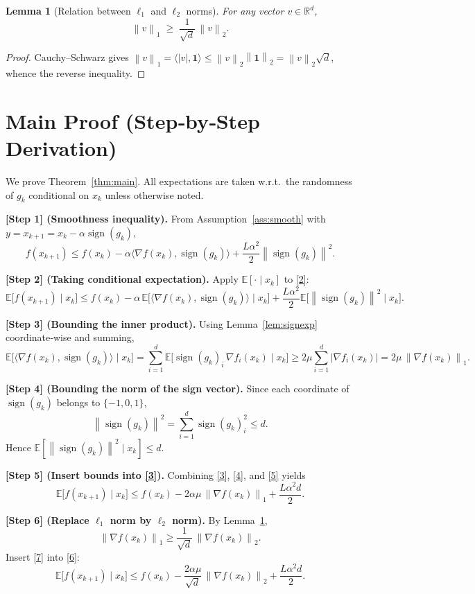 \documentclass{article}
\newtheorem{lemma}{Lemma}
\newcommand{\sign}{\operatorname{sign}}
\newcommand{\E}{\mathbb{E}}
\newcommand{\R}{\mathbb{R}}
\newcommand{\norm}[1]{\left\lVert#1\right\rVert}
\newcommand{\ip}[2]{\langle #1,#2\rangle}
\begin{document}
\begin{lemma}[Relation between $\ell_1$ and $\ell_2$ norms]\label{lem:l1l2}
For any vector $v\in\R^{d}$,
\[
\norm{v}_1 \;\ge\; \frac{1}{\sqrt d}\,\norm{v}_2 .
\tag{L1}
\]
\end{lemma}
\begin{proof}
Cauchy–Schwarz gives $\norm{v}_1 = \ip{|v|}{\mathbf{1}}\le
\norm{v}_2\norm{\mathbf{1}}_2 = \norm{v}_2\sqrt d$, whence the reverse inequality.
\end{proof}

\section*{Main Proof (Step‑by‑Step Derivation)}
We prove Theorem~\ref{thm:main}.  All expectations are taken w.r.t.\ the randomness of
$g_k$ conditional on $x_k$ unless otherwise noted.

\bigskip
\noindent\textbf{[Step 1] (Smoothness inequality).}
From Assumption~\ref{ass:smooth} with $y=x_{k+1}=x_k-\alpha\sign(g_k)$,
\[
f(x_{k+1})\le f(x_k)-\alpha\ip{\nabla f(x_k)}{\sign(g_k)}+\frac{L\alpha^2}{2}\norm{\sign(g_k)}^2 .
\tag{2}
\]

\noindent\textbf{[Step 2] (Taking conditional expectation).}
Apply $\E[\cdot\mid x_k]$ to \eqref{2}:
\[
\E\!\bigl[f(x_{k+1})\mid x_k\bigr]
\le f(x_k)-\alpha\,\E\!\bigl[\ip{\nabla f(x_k)}{\sign(g_k)}\mid x_k\bigr]
+\frac{L\alpha^2}{2}\E\!\bigl[\norm{\sign(g_k)}^2\mid x_k\bigr].
\tag{3}
\]

\noindent\textbf{[Step 3] (Bounding the inner product).}
Using Lemma~\ref{lem:signexp} coordinate‑wise and summing,
\[
\E\!\bigl[\ip{\nabla f(x_k)}{\sign(g_k)}\mid x_k\bigr]
=\sum_{i=1}^d \E\!\bigl[\sign(g_k)_i\,\nabla f_i(x_k)\mid x_k\bigr]
\ge 2\mu\sum_{i=1}^d |\nabla f_i(x_k)|
=2\mu\,\norm{\nabla f(x_k)}_1 .
\tag{4}
\]

\noindent\textbf{[Step 4] (Bounding the norm of the sign vector).}
Since each coordinate of $\sign(g_k)$ belongs to $\{-1,0,1\}$,
\[
\norm{\sign(g_k)}^2 = \sum_{i=1}^d \sign(g_k)_i^2 \le d .
\tag{5}
\]
Hence $\E[\norm{\sign(g_k)}^2\mid x_k]\le d$.

\noindent\textbf{[Step 5] (Insert bounds into \eqref{3}).}
Combining \eqref{3}, \eqref{4}, and \eqref{5} yields
\[
\E\!\bigl[f(x_{k+1})\mid x_k\bigr]
\le f(x_k)-2\alpha\mu\,\norm{\nabla f(x_k)}_1
+\frac{L\alpha^2 d}{2}.
\tag{6}
\]

\noindent\textbf{[Step 6] (Replace $\ell_1$ norm by $\ell_2$ norm).}
By Lemma~\ref{lem:l1l2},
\[
\norm{\nabla f(x_k)}_1\ge \frac{1}{\sqrt d}\,\norm{\nabla f(x_k)}_2 .
\tag{7}
\]
Insert \eqref{7} into \eqref{6}:
\[
\E\!\bigl[f(x_{k+1})\mid x_k\bigr]
\le f(x_k)-\frac{2\alpha\mu}{\sqrt d}\,\norm{\nabla f(x_k)}_2
+\frac{L\alpha^2 d}{2}.
\tag{8}
\]
\end{document}

